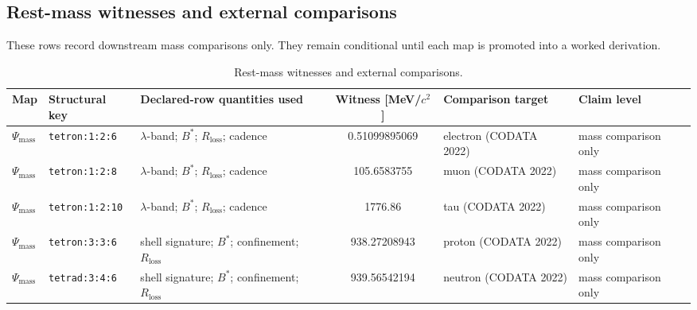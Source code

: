 \subsection{Rest-mass witnesses and external comparisons}
\label{man:rest-mass-witness-comparison}

These rows record downstream mass comparisons only. They remain conditional until each map is promoted into a worked derivation.

\begin{table}[H]
\centering
\caption{Rest-mass witnesses and external comparisons.}
\label{tab:rest-mass-witnesses}
\begin{threeparttable}
\small
\begin{tabularx}{\linewidth}{@{}lX X c X l@{}}
\toprule
Map & Structural key & Declared-row quantities used & Witness [MeV/$c^2$] & Comparison target & Claim level \\
\midrule
\(\Psi_{\mathrm{mass}}\) & \texttt{tetron:1:2:6} & $\lambda$-band; $B^*$; $R_{\mathrm{loss}}$; cadence & 0.51099895069 & electron (CODATA 2022) & mass comparison only \\
\(\Psi_{\mathrm{mass}}\) & \texttt{tetron:1:2:8} & $\lambda$-band; $B^*$; $R_{\mathrm{loss}}$; cadence & 105.6583755 & muon (CODATA 2022) & mass comparison only \\
\(\Psi_{\mathrm{mass}}\) & \texttt{tetron:1:2:10} & $\lambda$-band; $B^*$; $R_{\mathrm{loss}}$; cadence & 1776.86 & tau (CODATA 2022) & mass comparison only \\
\(\Psi_{\mathrm{mass}}\) & \texttt{tetron:3:3:6} & shell signature; $B^*$; confinement; $R_{\mathrm{loss}}$ & 938.27208943 & proton (CODATA 2022) & mass comparison only \\
\(\Psi_{\mathrm{mass}}\) & \texttt{tetrad:3:4:6} & shell signature; $B^*$; confinement; $R_{\mathrm{loss}}$ & 939.56542194 & neutron (CODATA 2022) & mass comparison only \\
\bottomrule
\end{tabularx}
\end{threeparttable}
\end{table}

